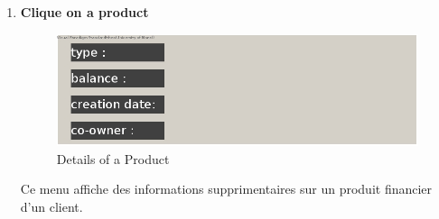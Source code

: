 \documentclass[../rapport.tex]{subfiles}
\begin{document}
\begin{enumerate}
\newpage
\item \textbf{Clique on a product} \\
		\begin{figure}[h!]
				\centering \includegraphics[scale=0.2]{ressources/photos_diagrammes/app2/gui/clickOnAProductInProductMenu.jpg}
				\caption{ Details of a Product }
		\end{figure}
Ce menu affiche des informations supprimentaires sur un produit financier d'un client.\\

\end{enumerate}
\newpage
\end{document}
